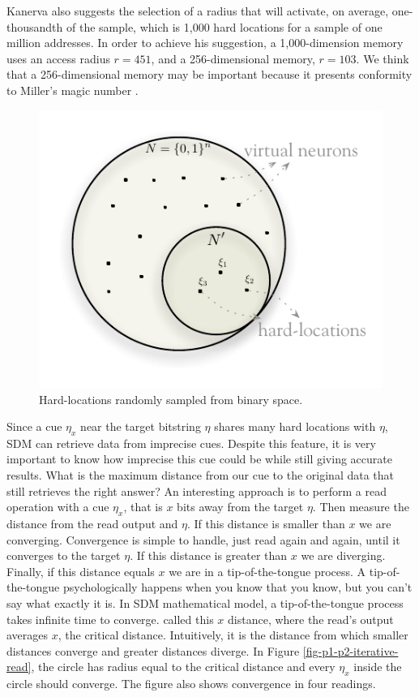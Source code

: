 Kanerva also suggests the selection of a radius that will activate, on average, one-thousandth of the sample, which is 1,000 hard locations for a sample of one million addresses. In order to achieve his suggestion, a 1,000-dimension memory uses an access radius $r=451$, and a 256-dimensional memory, $r=103$. We think that a 256-dimensional memory may be important because it presents conformity to Miller's magic number \citep{Linhares2011}.

\begin{figure}[!htb]
\centering\includegraphics[scale=0.75]{./images02/hardlocations.pdf}

\caption{Hard-locations randomly sampled from binary space.\label{fig-hardlocations}}
\end{figure}


Since a cue $\eta_{x}$ near the target bitstring $\eta$ shares many hard locations with $\eta$, SDM can retrieve data from imprecise cues. Despite this feature, it is very important to know how imprecise this cue could be while still giving accurate results. What is the maximum distance from our cue to the original data that still retrieves the right answer? An interesting approach is to perform a read operation with a cue $\eta_{x}$, that is $x$ bits away from the target $\eta$.  Then measure the distance from the read output and $\eta$. If this distance is smaller than $x$ we are converging. Convergence is simple to handle, just read again and again, until it converges to the target $\eta$. If this distance is greater than $x$ we are diverging. Finally, if this distance equals $x$ we are in a tip-of-the-tongue process.  A tip-of-the-tongue psychologically happens when you know that you know, but you can't say what exactly it is. In SDM mathematical model, a tip-of-the-tongue process takes infinite time to converge. \citet{Kanerva1988} called this $x$ distance, where the read's output averages $x$, the critical distance. Intuitively, it is the distance from which smaller distances converge and greater distances diverge. In Figure \ref{fig-p1-p2-iterative-read}, the circle has radius equal to the critical distance and every $\eta_{x}$ inside the circle should converge.  The figure also shows convergence in four readings.

